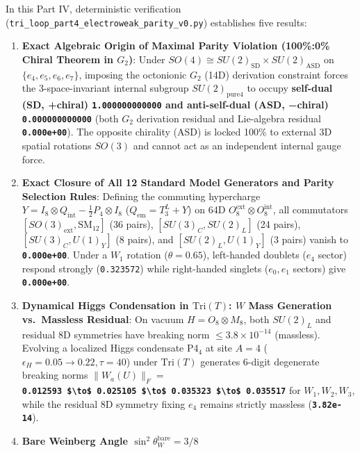 \documentclass[
  a4paper,
]{article}
\providecommand{\tightlist}{%
  \setlength{\itemsep}{0pt}\setlength{\parskip}{0pt}}
\begin{document}
In this Part IV, deterministic verification
(\texttt{tri\_loop\_part4\_electroweak\_parity\_v0.py}) establishes five
results:

\begin{enumerate}
\def\labelenumi{\arabic{enumi}.}
\tightlist
\item
  \textbf{Exact Algebraic Origin of Maximal Parity Violation (100\%:0\%
  Chiral Theorem in \(G_2\))}: Under
  \(SO(4) \cong SU(2)_{\mathrm{SD}} \times SU(2)_{\mathrm{ASD}}\) on
  \(\{e_4,e_5,e_6,e_7\}\), imposing the octonionic \(G_2\) (14D)
  derivation constraint forces the 3-space-invariant internal subgroup
  \(SU(2)_{\mathrm{pure4}}\) to occupy \textbf{self-dual (SD, +chiral)
  \texttt{1.000000000000} and anti-self-dual (ASD, −chiral)
  \texttt{0.000000000000}} (both \(G_2\) derivation residual and
  Lie-algebra residual \textbf{\texttt{0.000e+00}}). The opposite
  chirality (ASD) is locked 100\% to external 3D spatial rotations
  \(SO(3)\) and cannot act as an independent internal gauge force.
\item
  \textbf{Exact Closure of All 12 Standard Model Generators and Parity
  Selection Rules}: Defining the commuting hypercharge
  \(Y = I_8\otimes Q_{\mathrm{int}} - \frac{1}{2}P_4\otimes I_8\)
  (\(Q_{\mathrm{em}} = T_3^L + Y\)) on 64D
  \(O_8^{\mathrm{ext}}\otimes O_8^{\mathrm{int}}\), all commutators
  \([SO(3)_{\mathrm{ext}}, \mathrm{SM}_{12}]\) (36 pairs),
  \([SU(3)_C, SU(2)_L]\) (24 pairs), \([SU(3)_C, U(1)_Y]\) (8 pairs),
  and \([SU(2)_L, U(1)_Y]\) (3 pairs) vanish to
  \textbf{\texttt{0.000e+00}}. Under a \(W_1\) rotation
  (\(\theta=0.65\)), left-handed doublets (\(e_4\) sector) respond
  strongly (\texttt{0.323572}) while right-handed singlets (\(e_0, e_1\)
  sectors) give \textbf{\texttt{0.000e+00}}.
\item
  \textbf{Dynamical Higgs Condensation in \(\mathrm{Tri}(T)\): \(W\)
  Mass Generation vs.~Massless Residual}: On vacuum
  \(H = O_8\otimes M_8\), both \(SU(2)_L\) and residual 8D symmetries
  have breaking norm \(\le 3.8\times 10^{-14}\) (massless). Evolving a
  localized Higgs condensate P4\(_4\) at site \(A=4\)
  (\(\epsilon_H = 0.05 \to 0.22, \tau=40\)) under \(\mathrm{Tri}(T)\)
  generates 6-digit degenerate breaking norms \(\|W_a(U)\|_F =\)
  \textbf{\texttt{0.012593\ \$\textbackslash{}to\$\ 0.025105\ \$\textbackslash{}to\$\ 0.035323\ \$\textbackslash{}to\$\ 0.035517}}
  for \(W_1, W_2, W_3\), while the residual 8D symmetry fixing \(e_4\)
  remains strictly massless (\textbf{\texttt{3.82e-14}}).
\item
  \textbf{Bare Weinberg Angle \(\sin^2\theta_W^{\mathrm{bare}} = 3/8\)
}
\end{enumerate}
\end{document}
